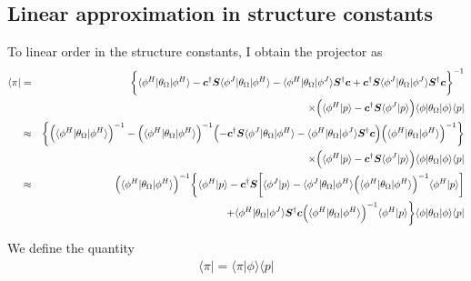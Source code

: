 \documentclass[11pt,a4paper]{report}
\begin{document}
\subsection{Linear approximation in structure constants}
To linear order in the structure constants, I obtain the projector as
\begin{eqnarray}
\langle\pi|
&=& 
\biggl\lbrace
\langle\phi^H|\theta_\Omega|\phi^H\rangle
-\mat{c}^\dagger\mat{S}\langle\phi^J|\theta_\Omega|\phi^H\rangle
-\langle\phi^H|\theta_\Omega|\phi^J\rangle\mat{S}^\dagger\mat{c}
+\mat{c}^\dagger\mat{S}\langle\phi^J|\theta_\Omega
|\phi^J\rangle\mat{S}^\dagger\mat{c}
\biggr\rbrace^{-1}
\nonumber\\
%
&&\times\Bigl(\langle\phi^H|p\rangle
-\mat{c}^\dagger\mat{S}\langle\phi^J|p\rangle\Bigr)
\langle\phi|\theta_\Omega|\phi\rangle
\langle{p}|
\nonumber\\
%
%
%
&\approx& 
\biggl\lbrace
\Bigl(\langle\phi^H|\theta_\Omega|\phi^H\rangle\Bigr)^{-1}
-
\Bigl(\langle\phi^H|\theta_\Omega|\phi^H\rangle\Bigr)^{-1}
\Bigl(
-\mat{c}^\dagger\mat{S}\langle\phi^J|\theta_\Omega|\phi^H\rangle
-\langle\phi^H|\theta_\Omega|\phi^J\rangle\mat{S}^\dagger\mat{c}
\Bigr)
\Bigl(\langle\phi^H|\theta_\Omega|\phi^H\rangle\Bigr)^{-1}
\biggr\rbrace
\nonumber\\
%
&&\times
\Bigl(
\langle\phi^H|p\rangle-\mat{c}^\dagger\mat{S}\langle\phi^J|p\rangle
\Bigr)
\langle\phi|\theta_\Omega|\phi\rangle
\langle{p}|
\nonumber\\
%
%
%
&\approx& 
\Bigl(\langle\phi^H|\theta_\Omega|\phi^H\rangle\Bigr)^{-1}
\biggl\lbrace
\langle\phi^H|p\rangle
-
\mat{c}^\dagger\mat{S}
\biggl[
\langle\phi^J|p\rangle
-
\langle\phi^J|\theta_\Omega|\phi^H\rangle
\Bigl(\langle\phi^H|\theta_\Omega|\phi^H\rangle\Bigr)^{-1}
\langle\phi^H|p\rangle\biggr]
\nonumber\\
&&+\langle\phi^H|\theta_\Omega|\phi^J\rangle\mat{S}^\dagger\mat{c}
\Bigl(\langle\phi^H|\theta_\Omega|\phi^H\rangle\Bigr)^{-1}
\langle\phi^H|p\rangle
\biggr\rbrace
\langle\phi|\theta_\Omega|\phi\rangle
\langle{p}|
\end{eqnarray}


We define the quantity
\begin{eqnarray}
\langle\pi|=\langle\pi|\phi\rangle\langle{p}|
\end{eqnarray}
\end{document}
